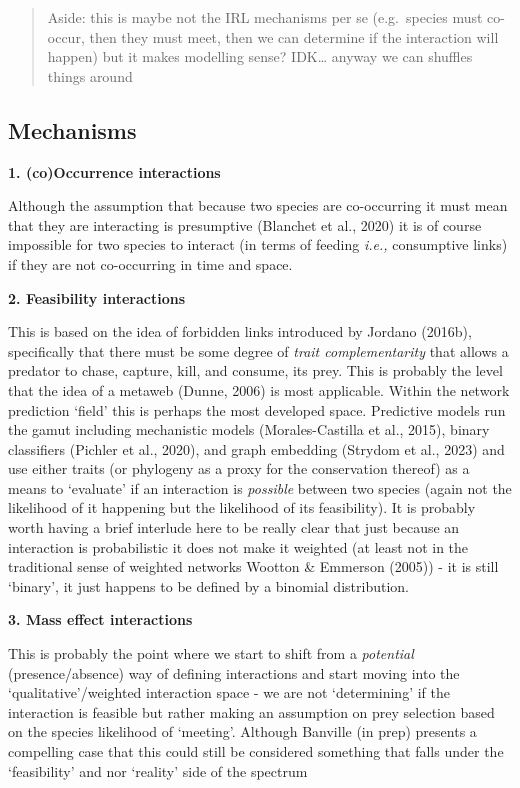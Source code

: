 \documentclass[
]{article}
\begin{document}
\begin{tcolorbox}
\begin{figure}[H]
\end{figure}%

\begin{quote}
Aside: this is maybe not the IRL mechanisms per se (e.g.~species must
co-occur, then they must meet, then we can determine if the interaction
will happen) but it makes modelling sense? IDK\ldots{} anyway we can
shuffles things around
\end{quote}

\subsection*{Mechanisms}\label{mechanisms}

\textbf{1. (co)Occurrence interactions}

Although the assumption that because two species are co-occurring it
must mean that they are interacting is presumptive (Blanchet et al.,
2020) it is of course impossible for two species to interact (in terms
of feeding \emph{i.e.,} consumptive links) if they are not co-occurring
in time and space.

\textbf{2. Feasibility interactions}

This is based on the idea of forbidden links introduced by Jordano
(2016b), specifically that there must be some degree of \emph{trait
complementarity} that allows a predator to chase, capture, kill, and
consume, its prey. This is probably the level that the idea of a metaweb
(Dunne, 2006) is most applicable. Within the network prediction `field'
this is perhaps the most developed space. Predictive models run the
gamut including mechanistic models (Morales-Castilla et al., 2015),
binary classifiers (Pichler et al., 2020), and graph embedding (Strydom
et al., 2023) and use either traits (or phylogeny as a proxy for the
conservation thereof) as a means to `evaluate' if an interaction is
\emph{possible} between two species (again not the likelihood of it
happening but the likelihood of its feasibility). It is probably worth
having a brief interlude here to be really clear that just because an
interaction is probabilistic it does not make it weighted (at least not
in the traditional sense of weighted networks Wootton \& Emmerson
(2005)) - it is still `binary', it just happens to be defined by a
binomial distribution.

\textbf{3. Mass effect interactions}

This is probably the point where we start to shift from a
\emph{potential} (presence/absence) way of defining interactions and
start moving into the `qualitative'/weighted interaction space - we are
not `determining' if the interaction is feasible but rather making an
assumption on prey selection based on the species likelihood of
`meeting'. Although Banville (in prep) presents a compelling case that
this could still be considered something that falls under the
`feasibility' and nor `reality' side of the spectrum


\end{tcolorbox}
\end{document}
